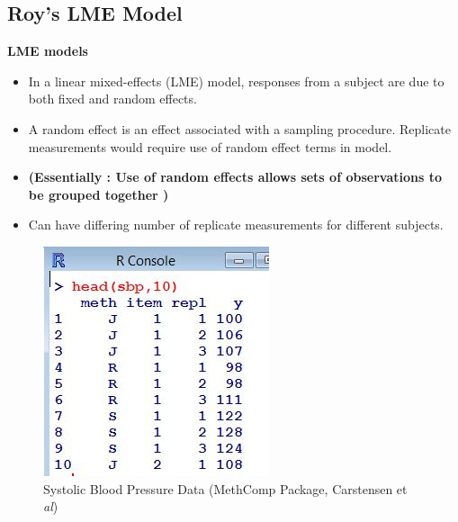 \documentclass[compress]{beamer}        %
\makeatletter
\newcommand{\tcb}{\textcolor{beamer@blendedblue}}
\makeatother
\begin{document}
			\subsection{Roy's LME Model}
		\begin{frame}{\bf \tcb{LME models}}
						\large
			\begin{itemize}\itemsep0.4cm
				\item In a linear mixed-effects (LME) model, responses from a subject are due to both fixed and random
				effects. 
				\item A random effect is an effect associated with a sampling procedure. Replicate measurements would require use of random effect terms in model.
				\item \textbf{(Essentially : Use of random effects allows sets of observations to be grouped together )}
				\item Can have differing number of replicate measurements for different subjects.
			\end{itemize}
		\end{frame}
\begin{frame}
\begin{figure}
\centering
\includegraphics[width=0.5\linewidth]{images/sbphead}
\caption{Systolic Blood Pressure Data (MethComp Package, Carstensen et \textit{al})}
\label{fig:sbpsummary}
\end{figure}
\end{frame}
\end{document}
